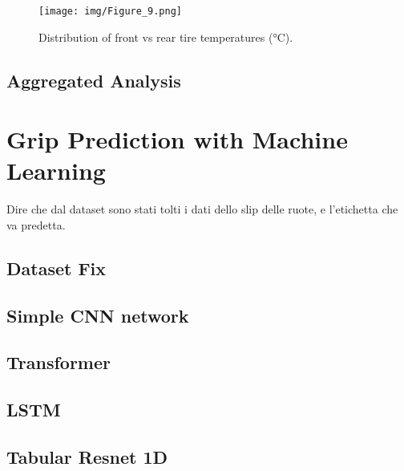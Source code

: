 \documentclass[a4paper,final,12pt]{report}
\begin{document}
\begin{figure}[H]
    \centering
    \texttt{[image: img/Figure\_9.png]}
    \caption{Distribution of front vs rear tire temperatures (°C).}
    \label{fig:tire_temperature_distribution}
\end{figure}































\subsection{Aggregated Analysis}

\section{Grip Prediction with Machine Learning}
Dire che dal dataset sono stati tolti i dati dello slip delle ruote, e l'etichetta che va predetta.

\subsection{Dataset Fix}

\subsection{Simple CNN network}

\subsection{Transformer}

\subsection{LSTM}

\subsection{Tabular Resnet 1D}
\end{document}
